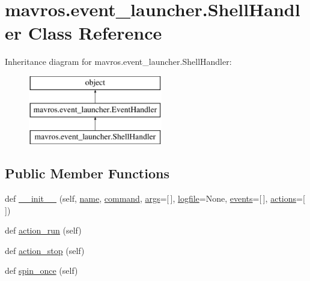 \hypertarget{classmavros_1_1event__launcher_1_1ShellHandler}{}\section{mavros.\+event\+\_\+launcher.\+Shell\+Handler Class Reference}
\label{classmavros_1_1event__launcher_1_1ShellHandler}
Inheritance diagram for mavros.\+event\+\_\+launcher.\+Shell\+Handler\+:\begin{figure}[H]
\begin{center}
\leavevmode
\includegraphics[height=3.000000cm]{classmavros_1_1event__launcher_1_1ShellHandler}
\end{center}
\end{figure}
\subsection*{Public Member Functions}
\begin{DoxyCompactItemize}
\item 
def \mbox{\hyperlink{classmavros_1_1event__launcher_1_1ShellHandler_a521665715cbddd6e99c316bb8accebcf}{\+\_\+\+\_\+init\+\_\+\+\_\+}} (self, \mbox{\hyperlink{classmavros_1_1event__launcher_1_1EventHandler_a09c331d1fc6308e8439779f0e15b83c2}{name}}, \mbox{\hyperlink{classmavros_1_1event__launcher_1_1ShellHandler_a0297802ce5086d8bdc70e72ef201446d}{command}}, \mbox{\hyperlink{classmavros_1_1event__launcher_1_1ShellHandler_a118590103db90fa1e414f3e592ae8bc7}{args}}=\mbox{[}$\,$\mbox{]}, \mbox{\hyperlink{classmavros_1_1event__launcher_1_1ShellHandler_ae55a715a3e3afb61c6e9fca7350a39f5}{logfile}}=None, \mbox{\hyperlink{classmavros_1_1event__launcher_1_1EventHandler_ab47ae1dad36ee9e1925ccacda87475d9}{events}}=\mbox{[}$\,$\mbox{]}, \mbox{\hyperlink{classmavros_1_1event__launcher_1_1EventHandler_a9b4f8bcde66b078510a28ed6c10c683b}{actions}}=\mbox{[}$\,$\mbox{]})
\item 
def \mbox{\hyperlink{classmavros_1_1event__launcher_1_1ShellHandler_a890771cef0f3a11c7def571baf0e2ba7}{action\+\_\+run}} (self)
\item 
def \mbox{\hyperlink{classmavros_1_1event__launcher_1_1ShellHandler_a32002f72c45bfd37962837b8548af842}{action\+\_\+stop}} (self)
\item 
def \mbox{\hyperlink{classmavros_1_1event__launcher_1_1ShellHandler_a4314485c686b763e0e93b96cedb1e6d0}{spin\+\_\+once}} (self)
\end{DoxyCompactItemize}
